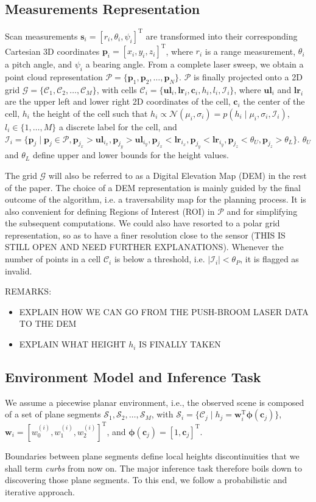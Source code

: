 \subsection{Measurements Representation}
Scan measurements $\mathbf{s}_i=[r_i,\theta_i,\psi_i]^\text{T}$ are transformed
into their corresponding Cartesian 3D coordinates $\mathbf{p}_i=[x_i,y_i,z_i]
^\text{T}$, where $r_i$ is a range measurement, $\theta_i$ a pitch angle, and
$\psi_i$ a bearing angle. From a complete laser sweep, we obtain a point cloud
representation $\mathcal{P}=\{\mathbf{p}_1,\mathbf{p}_2,\dots,\mathbf{p}_N\}$.
$\mathcal{P}$ is finally projected onto a 2D grid $\mathcal{G}=\{\mathcal{C}_1,
\mathcal{C}_2,\dots,\mathcal{C}_M\}$, with cells $\mathcal{C}_i=
\{\mathbf{ul}_i,\mathbf{lr}_i,\mathbf{c}_i,h_i,l_i,\mathcal{I}_i\}$, where
$\mathbf{ul}_i$ and $\mathbf{lr}_i$ are the upper left and lower right 2D
coordinates of the cell, $\mathbf{c}_i$ the center of the cell, $h_i$ the height
of the cell such that $h_i\propto\mathcal{N}(\mu_i,\sigma_i)=p(h_i\mid\mu_i,
\sigma_i,\mathcal{I}_i)$, $l_i\in\{1,\dots,M\}$ a discrete label for the cell,
and $\mathcal{I}_i=\{\mathbf{p}_j\mid\mathbf{p}_j\in\mathcal{P},
\mathbf{p}_{j_x}>\mathbf{ul}_{i_x},\mathbf{p}_{j_y}>\mathbf{ul}_{i_y}
,\mathbf{p}_{j_x}<\mathbf{lr}_{i_x},\mathbf{p}_{j_y}<\mathbf{lr}_{i_y}
,\mathbf{p}_{j_z}<\theta_U,\mathbf{p}_{j_z}>\theta_L\}$. $\theta_U$
and $\theta_L$ define upper and lower bounds for the height values.

The grid $\mathcal{G}$ will also be referred to as a Digital Elevation Map (DEM)
in the rest of the paper. The choice of a DEM representation is mainly guided by
the final outcome of the algorithm, i.e. a traversability map for the planning
process. It is also convenient for defining Regions of Interest (ROI) in
$\mathcal{P}$ and for simplifying the subsequent computations. We could also
have resorted to a polar grid representation, so as to have a finer resolution
close to the sensor (THIS IS STILL OPEN AND NEED FURTHER EXPLANATIONS). Whenever
the number of points in a cell $\mathcal{C}_i$ is below a threshold, i.e.
$|\mathcal{I}_i|<\theta_P$, it is flagged as invalid.

REMARKS:
\begin{itemize}
\item EXPLAIN HOW WE CAN GO FROM THE PUSH-BROOM LASER DATA TO THE DEM
\item EXPLAIN WHAT HEIGHT $h_i$ IS FINALLY TAKEN
\end{itemize}

\subsection{Environment Model and Inference Task}
We assume a piecewise planar environment, i.e., the observed scene is composed
of a set of plane segments $\mathcal{S}_1,\mathcal{S}_2,\dots,\mathcal{S}_M$, with
$\mathcal{S}_i=\{\mathcal{C}_j\mid h_j=\mathbf{w}_i^\text{T}\boldsymbol{\phi}
(\mathbf{c}_{j})\}$, $\mathbf{w}_i=[w_0^{(i)}, w_1^{(i)}, w_2^{(i)}]^\text{T}$,
and $\boldsymbol{\phi}(\mathbf{c}_{j})=[1,\mathbf{c}_j]^\text{T}$.

Boundaries between plane segments define local heights discontinuities that we
shall term \emph{curbs} from now on. The major inference task therefore boils
down to discovering those plane segments. To this end, we follow a probabilistic
and iterative approach.
